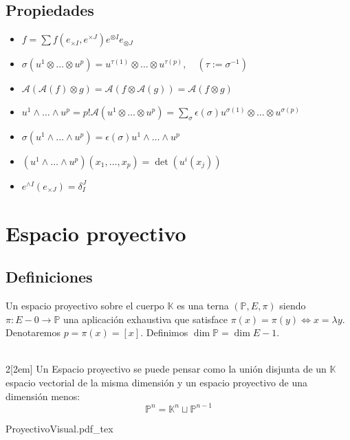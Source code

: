 \documentclass[leqno]{article}
\newcommand{\incfig}[1]{%
  \def\svgwidth{0.9\columnwidth}
  {#1.pdf_tex}
}
\newcommand{\A}{\mathcal{A}}
\newcommand{\K}{\mathbb{K}}
\renewcommand{\P}{\mathbb{P}}
\renewcommand{\A}{\mathcal{A}}
\begin{document}
\subsection{Propiedades}
\begin{itemize}
    \item $f=\sum f(e_{\times I}, e^{\times J})e^{\otimes I}e_{\otimes J}$
    \item $\sigma (u^1\otimes \ldots \otimes u^p) = u^{\tau(1)}\otimes \ldots \otimes u^{\tau(p)}, \quad (\tau := \sigma^{-1})$
    \item $\A(\A(f)\otimes g) = \A(f\otimes\A(g)) = \A(f\otimes g)$
    \item $u^1\wedge \ldots \wedge u^p = p!\A(u^1\otimes \ldots \otimes u^p) = \sum_\sigma \epsilon(\sigma)u^{\sigma(1)}\otimes \ldots \otimes u^{\sigma(p)}$
    \item $\sigma(u^1\wedge \ldots \wedge u^p) = \epsilon(\sigma)u^1\wedge \ldots \wedge u^p$
    \item $(u^1\wedge \ldots \wedge u^p)(x_1, \ldots, x_p) = \det (u^i(x_j))$
    \item $e^{\wedge I}(e_{\times J}) = \delta_I^J$
\end{itemize}




\section{Espacio proyectivo}
\subsection{Definiciones}
Un espacio proyectivo sobre el cuerpo $\K$ es una terna $(\P, E, \pi)$ siendo $\pi:E-{0}\to \P$ una aplicación exhaustiva que satisface $\pi(x)=\pi(y)\iff x=\lambda y$.\\
Denotaremos $p = \pi(x) = [x]$. Definimos $\dim\P = \dim E -1$. \\
\\

\begin{multicols}{2}[\columnsep2em] 
Un Espacio proyectivo se puede pensar como la unión disjunta de un $\K$ espacio vectorial de la misma dimensión y un espacio proyectivo de una dimensión menos:
$$
\P^n = \K^n \sqcup \P^{n-1}
$$
\columnbreak


    \incfig{ProyectivoVisual}

\end{multicols}
\end{document}
